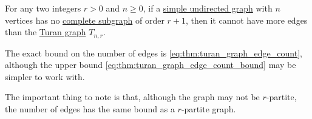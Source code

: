 \begin{theorem}\label{thm:turans_theorem}
  For any two integers \( r > 0 \) and \( n \geq 0 \), if a \hyperref[def:undirected_graph]{simple undirected graph} with \( n \) vertices has no \hyperref[def:complete_subgraph]{complete subgraph} of order \( r + 1 \), then it cannot have more edges than the \hyperref[def:turan_graph]{Turan graph} \( T_{n,r} \).
\end{theorem}
\begin{comments}
  \item The exact bound on the number of edges is \eqref{eq:thm:turan_graph_edge_count}, although the upper bound \eqref{eq:thm:turan_graph_edge_count_bound} may be simpler to work with.

  \item The important thing to note is that, although the graph may not be \( r \)-partite, the number of edges has the same bound as a \( r \)-partite graph.
\end{comments}
